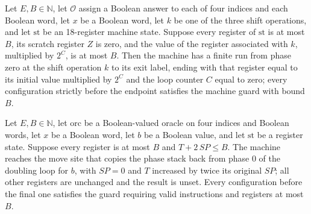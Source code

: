 \begin{theorem}
\label{Complexity.LogProg.SavitchARM.sh_run}
\leanok
{}
Let $E,B\in\mathbb N$, let $\mathcal O$ assign a Boolean answer to each of four indices
and each Boolean word, let $x$ be a Boolean word, let $k$ be one of the three shift
operations, and let $\mathrm{st}$ be an 18-register machine state. Suppose every
register of $\mathrm{st}$ is at most $B$, its scratch register $Z$ is zero, and the
value of the register associated with $k$, multiplied by $2^C$, is at most $B$. Then the
machine has a finite run from phase zero at the shift operation $k$ to its exit label,
ending with that register equal to its initial value multiplied by $2^C$ and the loop
counter $C$ equal to zero; every configuration strictly before the endpoint satisfies
the machine guard with bound $B$.
\end{theorem}

\begin{theorem}
\label{Complexity.LogProg.SavitchARM.dm_run}
\leanok
{}
Let $E,B\in\mathbb{N}$, let $\mathrm{orc}$ be a Boolean-valued oracle on four indices
and Boolean words, let $x$ be a Boolean word, let $b$ be a Boolean value, and let
$\mathrm{st}$ be a register state. Suppose every register is at most $B$ and
$T+2\,SP\leq B$. The machine reaches the move site that copies the phase stack back from
phase $0$ of the doubling loop for $b$, with $SP=0$ and $T$ increased by twice its
original $SP$; all other registers are unchanged and the result is unset. Every
configuration before the final one satisfies the guard requiring valid instructions and
registers at most $B$.
\end{theorem}

